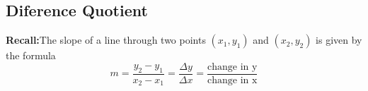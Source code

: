\begin{enumerate}
\noindent {} \hspace{1in} 

\newpage

\subsection{Diference Quotient}

\textbf{Recall:}The slope of a line through two points $(x_1, y_1)$ and $(x_2, y_2)$ is given by the formula
$$m=\frac{y_2-y_1}{x_2-x_1}=\frac{\Delta y}{\Delta x}=\frac{\text{change in y}}{\text{change in x}}$$



\end{enumerate}
